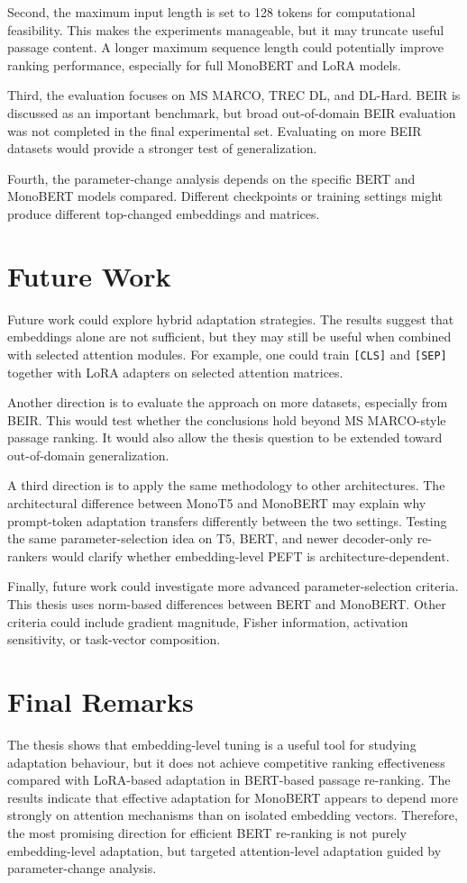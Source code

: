 Second, the maximum input length is set to 128 tokens for computational feasibility. This makes the experiments manageable, but it may truncate useful passage content. A longer maximum sequence length could potentially improve ranking performance, especially for full MonoBERT and LoRA models.

Third, the evaluation focuses on MS MARCO, TREC DL, and DL-Hard. BEIR is discussed as an important benchmark, but broad out-of-domain BEIR evaluation was not completed in the final experimental set. Evaluating on more BEIR datasets would provide a stronger test of generalization.

Fourth, the parameter-change analysis depends on the specific BERT and MonoBERT models compared. Different checkpoints or training settings might produce different top-changed embeddings and matrices.

\section{Future Work}
\label{sec:conclusions_future}

Future work could explore hybrid adaptation strategies. The results suggest that embeddings alone are not sufficient, but they may still be useful when combined with selected attention modules. For example, one could train \texttt{[CLS]} and \texttt{[SEP]} together with LoRA adapters on selected attention matrices.

Another direction is to evaluate the approach on more datasets, especially from BEIR. This would test whether the conclusions hold beyond MS MARCO-style passage ranking. It would also allow the thesis question to be extended toward out-of-domain generalization.

A third direction is to apply the same methodology to other architectures. The architectural difference between MonoT5 and MonoBERT may explain why prompt-token adaptation transfers differently between the two settings. Testing the same parameter-selection idea on T5, BERT, and newer decoder-only re-rankers would clarify whether embedding-level PEFT is architecture-dependent.

Finally, future work could investigate more advanced parameter-selection criteria. This thesis uses norm-based differences between BERT and MonoBERT. Other criteria could include gradient magnitude, Fisher information, activation sensitivity, or task-vector composition.

\section{Final Remarks}
\label{sec:conclusions_final}

The thesis shows that embedding-level tuning is a useful tool for studying adaptation behaviour, but it does not achieve competitive ranking effectiveness compared with LoRA-based adaptation in BERT-based passage re-ranking. The results indicate that effective adaptation for MonoBERT appears to depend more strongly on attention mechanisms than on isolated embedding vectors. Therefore, the most promising direction for efficient BERT re-ranking is not purely embedding-level adaptation, but targeted attention-level adaptation guided by parameter-change analysis.